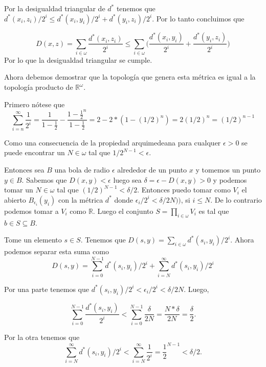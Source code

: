 \documentclass[letter,twoside,12pt]{article}
\begin{document}
\begin{enumerate}
Por la desigualdad triangular de $ d^* $ tenemos que $ d^*(x_i,z_i)/2^i \leq d^*(x_i,y_i)/2^i+d^*(y_i,z_i)/2^i $. Por lo tanto concluimos que

\begin{equation}
D(x,z)=\sum_{i \in \omega} \frac{d^*(x_i,z_i)}{2^i} \leq \sum_{i \in \omega} \Big(\frac{d^*(x_i,y_i)}{2^i}+\frac{d^*(y_i,z_i)}{2^i}\Big) \nonumber
\end{equation}
Por lo que la desigualdad triangular se cumple.

Ahora debemos demostrar que la topología que genera esta métrica es igual a la topología producto de $ \mathbb{R}^\omega $.

Primero nótese que 
\begin{equation}
\sum_{i =n}^{\infty} \frac{1}{2^i} = \frac{1}{1-\frac{1}{2}}-\frac{1-\frac{1}{2}^n}{1-\frac{1}{2}}= 2-2*(1-(1/2)^n)=2(1/2)^n=(1/2)^{n-1} \nonumber
\end{equation}

Como una consecuencia de la propiedad arquimedeana para cualquer $ \epsilon > 0 $ se puede encontrar un $ N \in \omega $ tal que $ 1/2^{N-1} < \epsilon$.

Entonces sea $ B $ una bola de radio $ \epsilon $ alrededor de un punto $ x $ y tomemos un punto $ y \in B $. Sabemos que $ D(x,y)<\epsilon $ luego sea $ \delta = \epsilon-D(x,y)>0 $ y podemos tomar un $N \in \omega$ tal que $ (1/2)^{N-1} <\delta/2$. Entonces puedo tomar como $ V_i $ el abierto $ B_{\epsilon_i}(y_i)$ con la métrica $ d^* $ donde  $\epsilon_i/2^i<\delta/2N))$, si $ i \leq N $. De lo contrario podemos tomar a $ V_i $ como $ \mathbb{R} $. Luego el conjunto $ S = \prod_{i \in \omega} V_i$ es tal que $ b \in S \subseteq B $. 

Tome un elemento $ s \in S $. Tenemos que $ D(s,y) = \sum_{i \in \omega}d^*(s_i,y_i)/2^i$. Ahora podemos separar esta suma como
\begin{equation}
D(s,y) = \sum_{i=0}^{N-1}d^*(s_i,y_i)/2^i +  \sum_{i=N}^{\infty}d^*(s_i,y_i)/2^i \nonumber
\end{equation}

Por una parte tenemos que $ d^*(s_i,y_i)/2^i < \epsilon_i/2^i<\delta/2N$. Luego,

\begin{equation}
\sum_{i=0}^{N-1}\frac{d^*(s_i,y_i)}{2^i} < \sum_{i=0}^{N-1} \frac{\delta}{2N} = \frac{N*\delta}{2N} = \frac{\delta}{2}. \nonumber
\end{equation}

Por la otra tenemos que
\begin{equation}
\sum_{i=N}^{\infty}d^*(s_i,y_i)/2^i < \sum_{i=N}^{\infty}\frac{1}{2^i}=\frac{1}{2}^{N-1}<\delta/2. \nonumber
\end{equation}


\end{enumerate}
\end{document}
